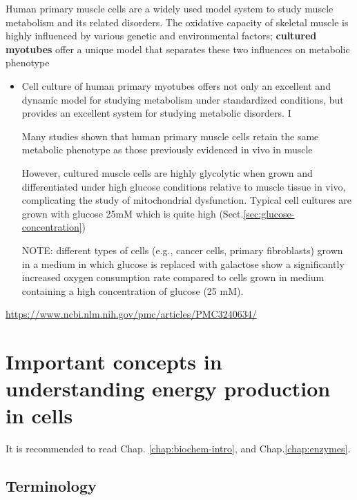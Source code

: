 Human primary muscle cells are a widely used model system to study muscle
metabolism and its related disorders.
The oxidative capacity of skeletal muscle is highly influenced by various
genetic and environmental factors; {\bf cultured myotubes} offer a unique model
that separates these two influences on metabolic phenotype

\begin{itemize}
  \item  Cell culture of human primary myotubes offers not only an excellent and
  dynamic model for studying metabolism under standardized conditions, but
  provides an excellent system for studying metabolic disorders. I 

Many studies shown that human primary muscle cells retain the same metabolic
phenotype as those previously evidenced in vivo in muscle

However, cultured muscle cells are highly glycolytic when grown and
differentiated under high glucose conditions relative to muscle tissue in vivo,
complicating the study of mitochondrial dysfunction. Typical cell cultures are
grown with glucose 25mM which is quite high (Sect.\ref{sec:glucose-concentration})

NOTE: different types of cells (e.g., cancer cells, primary fibroblasts) grown
in a medium in which glucose is replaced with galactose show a significantly
increased oxygen consumption rate compared to cells grown in medium containing a
high concentration of glucose (25 mM).  

\end{itemize}
\url{https://www.ncbi.nlm.nih.gov/pmc/articles/PMC3240634/}




\chapter{Important concepts in understanding energy production in cells}
\label{chap:energ-energy-prod}

It is recommended to read Chap. \ref{chap:biochem-intro}, and
Chap.\ref{chap:enzymes}.


\section{Terminology}
\label{sec:terminology}

